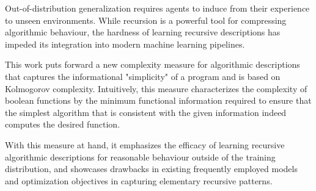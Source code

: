 %
%

Out-of-distribution generalization requires agents to induce from their experience to unseen environments. While recursion is a powerful tool for compressing algorithmic behaviour, the hardness of learning recursive descriptions has impeded its integration into modern machine learning pipelines.

This work puts forward a new complexity measure for algorithmic descriptions that captures the informational "simplicity" of a program and is based on Kolmogorov complexity.
Intuitively, this measure characterizes the complexity of boolean functions by the minimum functional information required to ensure that the simplest algorithm that is consistent with the given information indeed computes the desired function.

With this measure at hand, it emphasizes the efficacy of learning recursive algorithmic descriptions for reasonable behaviour outside of the training distribution, and showcases drawbacks in existing frequently employed models and optimization objectives in capturing elementary recursive patterns.
